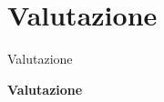 \section{Valutazione}
\begin{frame}{Valutazione}

	\centering
	\textbf{\Huge{Valutazione}}
\end{frame}



